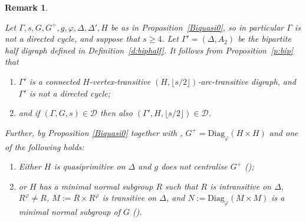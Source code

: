 \documentclass[11pt]{amsart}
\newtheorem{remark}[theorem]{Remark}
\newcommand{\Soc}{\mathrm{Soc}}
\newcommand\DD{{\mathscr{D}}}
\newcommand{\Diag}{\mathrm{Diag}}
\begin{document}
\begin{remark}\label{r:Biquasi}
{\rm 
    Let $\Gamma, s, G, G^+, g, \varphi, \Delta, \Delta', H$ be as in Proposition~\ref{Biquasi0}, so in particular $\Gamma$ is not a directed cycle, and suppose that $s\geqslant4$. Let    
    \(\Gamma'=(\Delta, A_2)\) be the bipartite half digraph defined in Definition~\ref{d:biphalf}. It follows from Proposition~\ref{p:bip} that
    \begin{enumerate}
        \item[(a)]  \(\Gamma'\) is a connected \(H\)-vertex-transitive \((H,\lfloor s/2\rfloor)\)-arc-transitive digraph, and \(\Gamma'\) is not a directed cycle; 
        \item[(b)] and if    $(\Gamma, G, s)\in\DD$ then also $(\Gamma', H, \lfloor s/2\rfloor)\in\DD$.
    \end{enumerate}
\noindent
Further, by Proposition \ref{Biquasi0}  together with \cite[Theorem 1.1]{Praeger03},  \(G^+=\Diag_{\varphi}(H\times H)\) and one of the following holds:
\begin{enumerate}
    \item[(c)] Either \(H\) is quasiprimitive on $\Delta$ and $g$ does not centralise $G^+$ (\cite[Theorem 1.1 (a)(i)]{Praeger03});
    \item[(d)] or \(H\) has a  minimal normal subgroup \(R\) such that \(R\) is intransitive on $\Delta$, \(R^{\varphi}\ne R\), %
    \(M:=R\times R^{\varphi}\) is transitive on \(\Delta\), and \(N:=\Diag_{\varphi}(M\times M)\) is a minimal normal subgroup of $G$ (\cite[Theorem 1.1 (c)]{Praeger03}). 
    
        

\end{enumerate}}
\end{remark}
\end{document}
